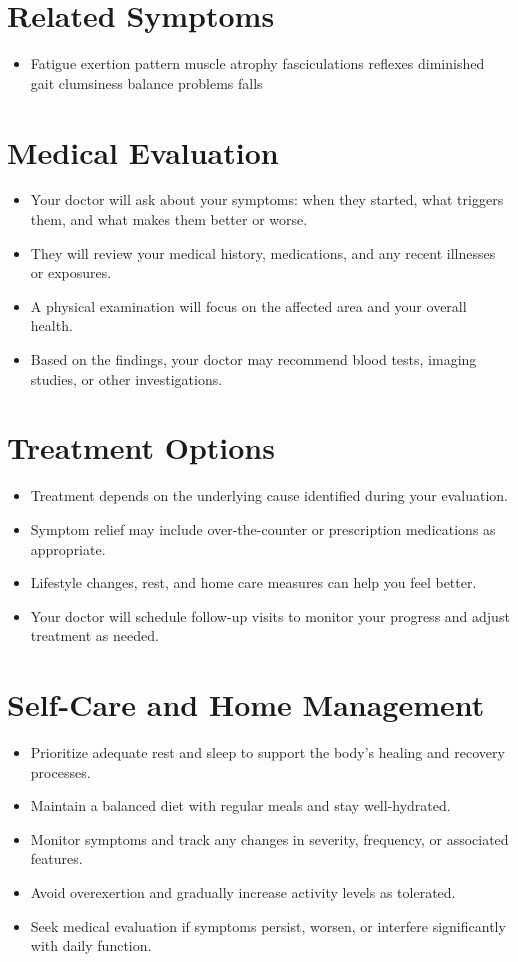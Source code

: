 \section*{Related Symptoms}
\begin{itemize}
  \item Fatigue exertion pattern muscle atrophy fasciculations reflexes diminished gait clumsiness balance problems falls
\end{itemize}

\section*{Medical Evaluation}
\begin{itemize}
  \item Your doctor will ask about your symptoms: when they started, what triggers them, and what makes them better or worse.
  \item They will review your medical history, medications, and any recent illnesses or exposures.
  \item A physical examination will focus on the affected area and your overall health.
  \item Based on the findings, your doctor may recommend blood tests, imaging studies, or other investigations.
\end{itemize}

\section*{Treatment Options}
\begin{itemize}
  \item Treatment depends on the underlying cause identified during your evaluation.
  \item Symptom relief may include over-the-counter or prescription medications as appropriate.
  \item Lifestyle changes, rest, and home care measures can help you feel better.
  \item Your doctor will schedule follow-up visits to monitor your progress and adjust treatment as needed.
\end{itemize}

\section*{Self-Care and Home Management}
\begin{itemize}
  \item Prioritize adequate rest and sleep to support the body's healing and recovery processes.
  \item Maintain a balanced diet with regular meals and stay well-hydrated.
  \item Monitor symptoms and track any changes in severity, frequency, or associated features.
  \item Avoid overexertion and gradually increase activity levels as tolerated.
  \item Seek medical evaluation if symptoms persist, worsen, or interfere significantly with daily function.
\end{itemize}

